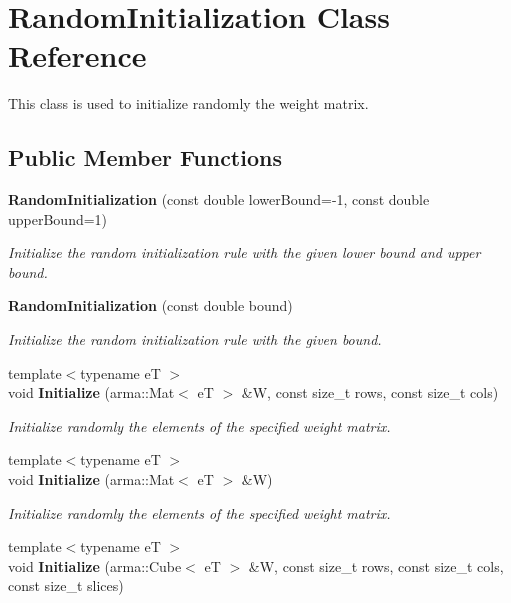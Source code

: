 \section{Random\+Initialization Class Reference}
\label{classmlpack_1_1ann_1_1RandomInitialization}


This class is used to initialize randomly the weight matrix.  


\subsection*{Public Member Functions}
\begin{DoxyCompactItemize}
\item 
\textbf{ Random\+Initialization} (const double lower\+Bound=-\/1, const double upper\+Bound=1)
\begin{DoxyCompactList}\small\item\em Initialize the random initialization rule with the given lower bound and upper bound. \end{DoxyCompactList}\item 
\textbf{ Random\+Initialization} (const double bound)
\begin{DoxyCompactList}\small\item\em Initialize the random initialization rule with the given bound. \end{DoxyCompactList}\item 
{\footnotesize template$<$typename eT $>$ }\\void \textbf{ Initialize} (arma\+::\+Mat$<$ eT $>$ \&W, const size\+\_\+t rows, const size\+\_\+t cols)
\begin{DoxyCompactList}\small\item\em Initialize randomly the elements of the specified weight matrix. \end{DoxyCompactList}\item 
{\footnotesize template$<$typename eT $>$ }\\void \textbf{ Initialize} (arma\+::\+Mat$<$ eT $>$ \&W)
\begin{DoxyCompactList}\small\item\em Initialize randomly the elements of the specified weight matrix. \end{DoxyCompactList}\item 
{\footnotesize template$<$typename eT $>$ }\\void \textbf{ Initialize} (arma\+::\+Cube$<$ eT $>$ \&W, const size\+\_\+t rows, const size\+\_\+t cols, const size\+\_\+t slices)

\end{DoxyCompactItemize}
